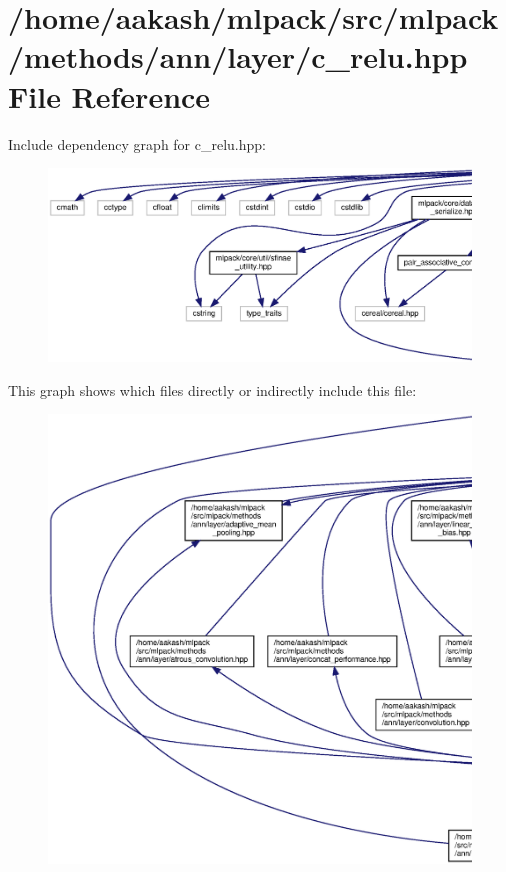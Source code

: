 \section{/home/aakash/mlpack/src/mlpack/methods/ann/layer/c\+\_\+relu.hpp File Reference}
\label{c__relu_8hpp}
Include dependency graph for c\+\_\+relu.\+hpp\+:
\nopagebreak
\begin{figure}[H]
\begin{center}
\leavevmode
\includegraphics[width=350pt]{c__relu_8hpp__incl}
\end{center}
\end{figure}
This graph shows which files directly or indirectly include this file\+:
\nopagebreak
\begin{figure}[H]
\begin{center}
\leavevmode
\includegraphics[width=350pt]{c__relu_8hpp__dep__incl}
\end{center}
\end{figure}
